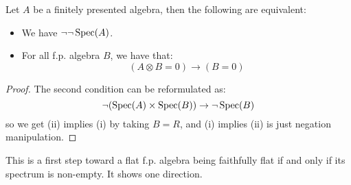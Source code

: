 \begin{lemma}
Let $A$ be a finitely presented algebra, then the following are equivalent:
\begin{itemize}[(i)]
\item We have $\neg\neg\operatorname{Spec}(A)$.
\item For all f.p. algebra $B$, we have that:
\[(A\otimes B = 0) \to (B=0)\]
\end{itemize}
\end{lemma}

\begin{proof}
The second condition can be reformulated as:
\[\neg(\operatorname{Spec}(A)\times\operatorname{Spec}(B))\to \neg\operatorname{Spec}(B)\]
so we get (ii) implies (i) by taking $B=R$, and (i) implies (ii) is just negation manipulation.
\end{proof}

This is a first step toward a flat f.p. algebra being faithfully flat if and only if its spectrum is non-empty. It shows one direction.
